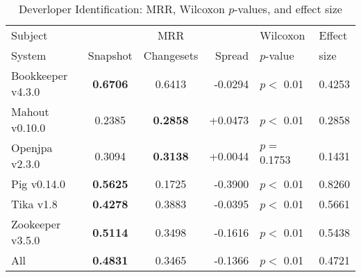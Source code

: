 \begin{table}[t]
\centering
\caption{Deverloper Identification: MRR, Wilcoxon $p$-values, and effect size}
\begin{tabular}{l|ccr|ll}
\toprule
Subject & & MRR & & Wilcoxon & Effect \\
System  &  Snapshot & Changesets & Spread & $p$-value & size \\
\midrule
Bookkeeper v4.3.0 & {\bf 0.6706 } & 0.6413 & -0.0294 & $p < $ 0.01 & 0.4253 \\
Mahout v0.10.0 & 0.2385 & {\bf 0.2858 } & +0.0473 & $p < $ 0.01 & 0.2858 \\
Openjpa v2.3.0 & 0.3094 & {\bf 0.3138 } & +0.0044 & $p = $ 0.1753 & 0.1431 \\
Pig v0.14.0 & {\bf 0.5625 } & 0.1725 & -0.3900 & $p < $ 0.01 & 0.8260 \\
Tika v1.8 & {\bf 0.4278 } & 0.3883 & -0.0395 & $p < $ 0.01 & 0.5661 \\
Zookeeper v3.5.0 & {\bf 0.5114 } & 0.3498 & -0.1616 & $p < $ 0.01 & 0.5438 \\
\midrule
All & {\bf 0.4831 } & 0.3465 & -0.1366 & $p < $ 0.01 & 0.4721 \\
\bottomrule
\end{tabular}
\label{table:triage_rq1}
\end{table}
